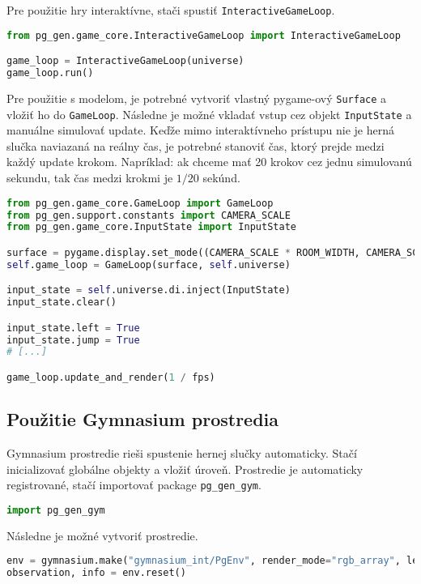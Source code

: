 Pre použitie hry interaktívne, stači spustiť \texttt{InteractiveGameLoop}.

\begin{lstlisting}[language=python]
from pg_gen.game_core.InteractiveGameLoop import InteractiveGameLoop

game_loop = InteractiveGameLoop(universe)
game_loop.run()
\end{lstlisting}

Pre použitie s modelom, je potrebné vytvoriť vlastný pygame-ový \texttt{Surface} a vložiť ho do \texttt{GameLoop}. Následne je možné vkladať vstup cez objekt \texttt{InputState} a manuálne simulovať update. Keďže mimo interaktívneho prístupu nie je herná slučka naviazaná na reálny čas, je potrebné stanoviť čas, ktorý prejde medzi každý update krokom. Napríklad: ak chceme mať 20 krokov cez jednu simulovanú sekundu, tak čas medzi krokmi je $ 1 / 20 $ sekúnd.

\begin{lstlisting}[language=python]
from pg_gen.game_core.GameLoop import GameLoop
from pg_gen.support.constants import CAMERA_SCALE
from pg_gen.game_core.InputState import InputState

surface = pygame.display.set_mode((CAMERA_SCALE * ROOM_WIDTH, CAMERA_SCALE * ROOM_HEIGHT))
self.game_loop = GameLoop(surface, self.universe)

input_state = self.universe.di.inject(InputState)
input_state.clear()

input_state.left = True
input_state.jump = True
# [...]

game_loop.update_and_render(1 / fps)
\end{lstlisting}

\subsection*{Použitie Gymnasium prostredia}

Gymnasium prostredie rieši spustenie hernej slučky automaticky. Stačí inicializovať globálne objekty a vložiť úroveň. Prostredie je automaticky registrované, stačí importovať package \texttt{pg\_gen\_gym}.

\begin{lstlisting}[language=python]
import pg_gen_gym
\end{lstlisting}

Následne je možné vytvoriť prostredie.

\begin{lstlisting}[language=python]
env = gymnasium.make("gymnasium_int/PgEnv", render_mode="rgb_array", level=level)
observation, info = env.reset()
\end{lstlisting}

